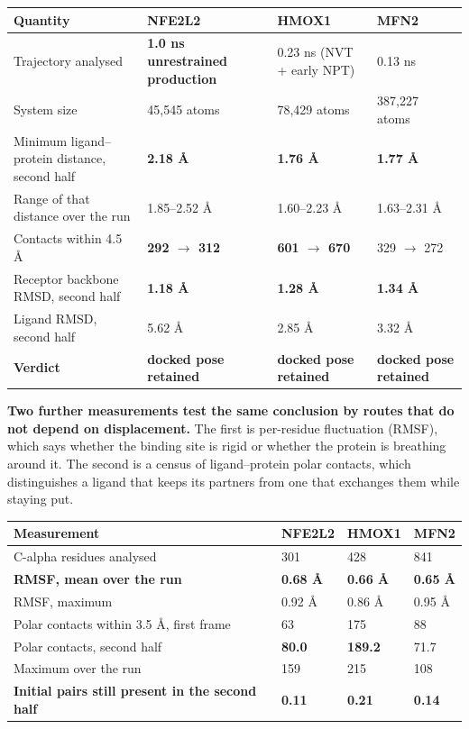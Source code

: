 \documentclass[utf8]{FrontiersinVancouver}
\begin{document}
\begin{table}[htbp]
\centering
\begin{tabular}{llll}
\hline
Quantity & NFE2L2 & HMOX1 & MFN2 \\
\hline
Trajectory analysed & \textbf{1.0 ns unrestrained production} & 0.23 ns (NVT + early NPT) & 0.13 ns \\
System size & 45,545 atoms & 78,429 atoms & 387,227 atoms \\
Minimum ligand--protein distance, second half & \textbf{2.18 \AA{}} & \textbf{1.76 \AA{}} & \textbf{1.77 \AA{}} \\
Range of that distance over the run & 1.85--2.52 \AA{} & 1.60--2.23 \AA{} & 1.63--2.31 \AA{} \\
Contacts within 4.5 \AA{} & \textbf{292 $\rightarrow$ 312} & \textbf{601 $\rightarrow$ 670} & 329 $\rightarrow$ 272 \\
Receptor backbone RMSD, second half & \textbf{1.18 \AA{}} & \textbf{1.28 \AA{}} & \textbf{1.34 \AA{}} \\
Ligand RMSD, second half & 5.62 \AA{} & 2.85 \AA{} & 3.32 \AA{} \\
\textbf{Verdict} & \textbf{docked pose retained} & \textbf{docked pose retained} & \textbf{docked pose retained} \\
\hline
\end{tabular}
\end{table}

\textbf{Two further measurements test the same conclusion by routes that do not depend on displacement.} The first is per-residue fluctuation (RMSF), which says whether the binding site is rigid or whether the protein is breathing around it. The second is a census of ligand--protein polar contacts, which distinguishes a ligand that keeps its partners from one that exchanges them while staying put.

\begin{table}[htbp]
\centering
\begin{tabular}{llll}
\hline
Measurement & NFE2L2 & HMOX1 & MFN2 \\
\hline
C-alpha residues analysed & 301 & 428 & 841 \\
\textbf{RMSF, mean over the run} & \textbf{0.68 \AA{}} & \textbf{0.66 \AA{}} & \textbf{0.65 \AA{}} \\
RMSF, maximum & 0.92 \AA{} & 0.86 \AA{} & 0.95 \AA{} \\
Polar contacts within 3.5 \AA{}, first frame & 63 & 175 & 88 \\
Polar contacts, second half & \textbf{80.0} & \textbf{189.2} & 71.7 \\
Maximum over the run & 159 & 215 & 108 \\
\textbf{Initial pairs still present in the second half} & \textbf{0.11} & \textbf{0.21} & \textbf{0.14} \\
\hline
\end{tabular}
\end{table}
\end{document}
